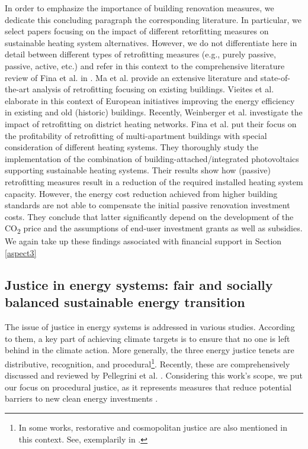 In order to emphasize the importance of building renovation measures, we dedicate this concluding paragraph the corresponding literature. In particular, we select papers focusing on the impact of different retorfitting measures on sustainable heating system alternatives. However, we do not differentiate here in detail between different types of retrofitting measures (e.g., purely passive, passive, active, etc.) and refer in this context to the comprehensive literature review of Fina et al. in \cite{fina2019profitability}. Ma et al. \cite{ma2012existing} provide an extensive literature and state-of-the-art analysis of retrofitting focusing on existing buildings. Vieites et al. \cite{vieites2015european} elaborate in this context of European initiatives improving  the energy efficiency in existing and old (historic) buildings. Recently, Weinberger et al. \cite{weinberger2021investigating} investigate the impact of retrofitting on district heating networks. Fina et al. \cite{fina2019profitability} put their focus on the profitability of retrofitting of multi-apartment buildings with special consideration of different heating systems. They thoroughly study the implementation of the combination of building-attached/integrated photovoltaics supporting sustainable heating systems. Their results show how (passive) retrofitting measures result in a reduction of the required installed heating system capacity. However, the energy cost reduction achieved from higher building standards are not able to compensate the initial passive renovation investment costs. They conclude that latter significantly depend on the development of the CO\textsubscript{2} price and the assumptions of end-user investment grants as well as subsidies. We again take up these findings associated with financial support in Section \ref{aspect3}

\subsection{Justice in energy systems: fair and socially balanced sustainable energy transition}\label{aspect2}
The issue of justice in energy systems is addressed in various studies. According to them, a key part of achieving climate targets is to ensure that no one is left behind in the climate action. More generally, the three energy justice tenets are distributive, recognition, and procedural\footnote{In some works, restorative and cosmopolitan justice are also mentioned in this context. See, exemplarily in \cite{oxfordjustice2021}.}. Recently, these are comprehensively discussed and reviewed by Pellegrini et al. \cite{pellegrini2020energy}. Considering this work's scope, we put our focus on procedural justice, as it represents measures that reduce potential barriers to new clean energy investments \cite{oxfordjustice2021}.\vspace{0.5cm}

